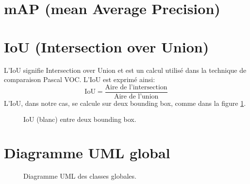 \begin{appendices}
	
\section*{mAP (mean Average Precision)}\label{app:mAP}
	
	
	
	
\section*{IoU (Intersection over Union)}\label{app:IoU}
L'IoU signifie Intersection over Union et est un calcul utilisé dans la technique de comparaison Pascal VOC.
L'IoU est exprimé ainsi:
$$\text{IoU} = \frac{\text{Aire de l'intersection}}{\text{Aire de l'union}}$$
L'IoU, dans notre cas, se calcule sur deux bounding box, comme dans la figure \ref{fig:iou_example}.
\begin{figure}[!htbp]
\center
\caption{IoU (blanc) entre deux bounding box.}
\label{fig:iou_example}
\end{figure}
\FloatBarrier
	
	
	
\clearpage
\section*{Diagramme UML global}\label{app:UMLGlobal}
\begin{figure}[!htbp]
	\center
	\caption{Diagramme UML des classes globales.}
	\label{fig:uml_diagram_classes}
\end{figure}
\FloatBarrier
	
	
	
	

\end{appendices}
